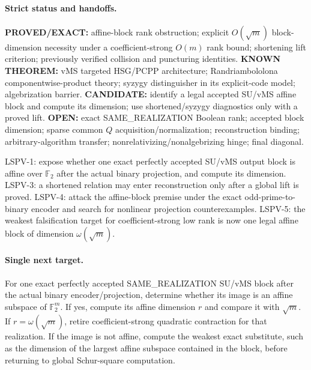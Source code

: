 \documentclass[11pt]{article}
\begin{document}
\paragraph{Strict status and handoffs.}
\textbf{PROVED/EXACT:} affine-block rank obstruction; explicit $O(\sqrt m)$ block-dimension necessity under a coefficient-strong $O(m)$ rank bound; shortening lift criterion; previously verified collision and puncturing identities.
\textbf{KNOWN THEOREM:} vMS targeted HSG/PCPP architecture; Randriambololona componentwise-product theory; syzygy distinguisher in its explicit-code model; algebrization barrier.
\textbf{CANDIDATE:} identify a legal accepted SU/vMS affine block and compute its dimension; use shortened/syzygy diagnostics only with a proved lift.
\textbf{OPEN:} exact SAME\_REALIZATION Boolean rank; accepted block dimension; sparse common $Q$ acquisition/normalization; reconstruction binding; arbitrary-algorithm transfer; nonrelativizing/nonalgebrizing hinge; final diagonal.

LSPV-1: expose whether one exact perfectly accepted SU/vMS output block is affine over $\mathbb F_2$ after the actual binary projection, and compute its dimension. LSPV-3: a shortened relation may enter reconstruction only after a global lift is proved. LSPV-4: attack the affine-block premise under the exact odd-prime-to-binary encoder and search for nonlinear projection counterexamples. LSPV-5: the weakest falsification target for coefficient-strong low rank is now one legal affine block of dimension $\omega(\sqrt m)$.

\paragraph{Single next target.}
For one exact perfectly accepted SAME\_REALIZATION SU/vMS block after the actual binary encoder/projection, determine whether its image is an affine subspace of $\mathbb F_2^m$. If yes, compute its affine dimension $r$ and compare it with $\sqrt m$. If $r=\omega(\sqrt m)$, retire coefficient-strong quadratic contraction for that realization. If the image is not affine, compute the weakest exact substitute, such as the dimension of the largest affine subspace contained in the block, before returning to global Schur-square computation.
\end{document}
